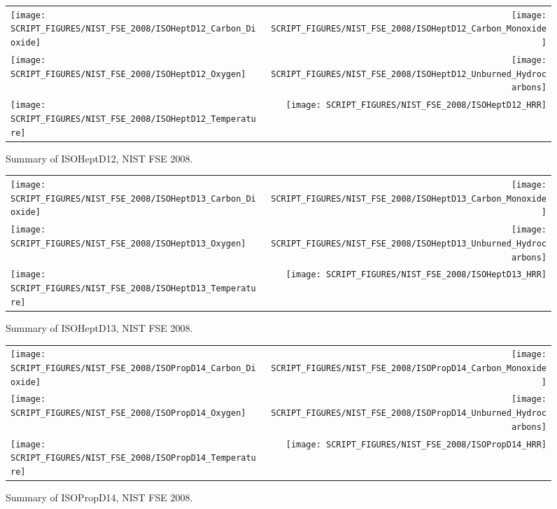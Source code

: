 \begin{figure}[p]
\begin{tabular*}{\textwidth}{l@{\extracolsep{\fill}}r}
\texttt{[image: SCRIPT\_FIGURES/NIST\_FSE\_2008/ISOHeptD12\_Carbon\_Dioxide]} &
\texttt{[image: SCRIPT\_FIGURES/NIST\_FSE\_2008/ISOHeptD12\_Carbon\_Monoxide]} \\
\texttt{[image: SCRIPT\_FIGURES/NIST\_FSE\_2008/ISOHeptD12\_Oxygen]} &
\texttt{[image: SCRIPT\_FIGURES/NIST\_FSE\_2008/ISOHeptD12\_Unburned\_Hydrocarbons]} \\
\texttt{[image: SCRIPT\_FIGURES/NIST\_FSE\_2008/ISOHeptD12\_Temperature]} &
\texttt{[image: SCRIPT\_FIGURES/NIST\_FSE\_2008/ISOHeptD12\_HRR]}
\end{tabular*}
\caption[Summary of ISOHeptD12, NIST FSE 2008]{Summary of ISOHeptD12, NIST FSE 2008.}
\label{NIST_FSE_1994_ISOHeptD12}
\end{figure}

\begin{figure}[p]
\begin{tabular*}{\textwidth}{l@{\extracolsep{\fill}}r}
\texttt{[image: SCRIPT\_FIGURES/NIST\_FSE\_2008/ISOHeptD13\_Carbon\_Dioxide]} &
\texttt{[image: SCRIPT\_FIGURES/NIST\_FSE\_2008/ISOHeptD13\_Carbon\_Monoxide]} \\
\texttt{[image: SCRIPT\_FIGURES/NIST\_FSE\_2008/ISOHeptD13\_Oxygen]} &
\texttt{[image: SCRIPT\_FIGURES/NIST\_FSE\_2008/ISOHeptD13\_Unburned\_Hydrocarbons]} \\
\texttt{[image: SCRIPT\_FIGURES/NIST\_FSE\_2008/ISOHeptD13\_Temperature]} &
\texttt{[image: SCRIPT\_FIGURES/NIST\_FSE\_2008/ISOHeptD13\_HRR]}
\end{tabular*}
\caption[Summary of ISOHeptD13, NIST FSE 2008]{Summary of ISOHeptD13, NIST FSE 2008.}
\label{NIST_FSE_1994_ISOHeptD13}
\end{figure}

\begin{figure}[p]
\begin{tabular*}{\textwidth}{l@{\extracolsep{\fill}}r}
\texttt{[image: SCRIPT\_FIGURES/NIST\_FSE\_2008/ISOPropD14\_Carbon\_Dioxide]} &
\texttt{[image: SCRIPT\_FIGURES/NIST\_FSE\_2008/ISOPropD14\_Carbon\_Monoxide]} \\
\texttt{[image: SCRIPT\_FIGURES/NIST\_FSE\_2008/ISOPropD14\_Oxygen]} &
\texttt{[image: SCRIPT\_FIGURES/NIST\_FSE\_2008/ISOPropD14\_Unburned\_Hydrocarbons]} \\
\texttt{[image: SCRIPT\_FIGURES/NIST\_FSE\_2008/ISOPropD14\_Temperature]} &
\texttt{[image: SCRIPT\_FIGURES/NIST\_FSE\_2008/ISOPropD14\_HRR]}
\end{tabular*}
\caption[Summary of ISOPropD14, NIST FSE 2008]{Summary of ISOPropD14, NIST FSE 2008.}
\label{NIST_FSE_1994_ISOPropD14}
\end{figure}

